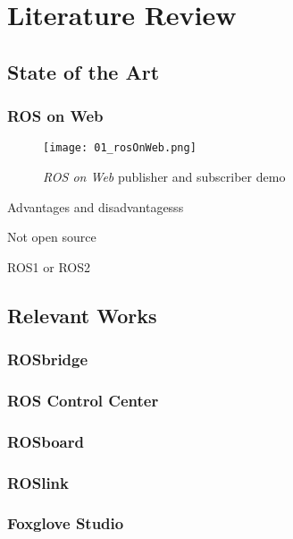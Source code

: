 \chapter{Literature Review}\label{cha:literature}

\section{State of the Art}\label{sec:state}

    \subsection{ROS on Web}\label{sub:ros_on_web}

        \begin{figure}[htbp]
            \centering
            \texttt{[image: 01\_rosOnWeb.png]}
            \caption{\textit{ROS on Web} publisher and subscriber demo}
        \end{figure}

        Advantages and disadvantagesss

        Not open source

        ROS1 or ROS2


\section{Relevant Works}

    \subsection{ROSbridge}

    \subsection{ROS Control Center}

    \subsection{ROSboard}

    \subsection{ROSlink}

    \subsection{Foxglove Studio}

